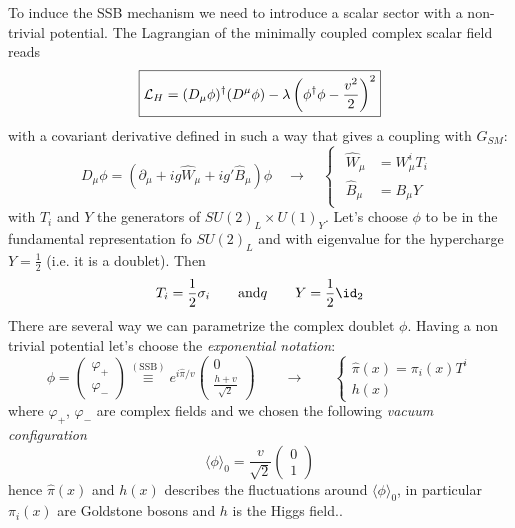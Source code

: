 \documentclass[TheoreticalPhy_ModB.tex]{subfiles}
\begin{document}
To induce the SSB mechanism we need to introduce a scalar sector with a non-trivial potential. The Lagrangian of the minimally coupled complex scalar field reads
\[\boxed{\mathcal L_{H}=(D_\mu\phi)^\dagger(D^\mu\phi)-\lambda\left(\phi^\dagger\phi-\frac{v^2}2\right)^2}\]
with a covariant derivative defined in such a way that gives a coupling with $G_{SM}$: 
\[D_\mu\phi=(\partial_\mu+ig\hat W_\mu+ig'\hat B_\mu)\phi\quad\to\quad\begin{cases}\begin{aligned}\hat W_\mu&=W_\mu^i T_i\\\hat B_\mu&=B_\mu Y\end{aligned}\end{cases}\]
with $T_i$ and $Y$ the generators of $SU(2)_L\times U(1)_Y$.
Let's choose $\phi$ to be in the fundamental representation fo $SU(2)_L$ and with eigenvalue for the hypercharge $Y=\frac12$ (i.e. it is a doublet). Then
\[T_i=\frac12\sigma_i\qquad\text{and}q\qquad Y=\frac12\id_2\]
There are several way we can parametrize the complex doublet $\phi$. Having a non trivial potential let's choose the \emph{exponential notation}:
\[\phi=\begin{pmatrix}\varphi_+\\\varphi_-\end{pmatrix}\overset{(\text{SSB})}{\equiv}e^{i\hat\pi/v}\begin{pmatrix}0\\\frac{h+v}{\sqrt2}\end{pmatrix}\qquad\to\qquad\begin{cases}\hat \pi(x)=\pi_i(x)T^i\\h(x)\end{cases}\]
where $\varphi_+$, $\varphi_-$ are complex fields and we chosen the following  \emph{vacuum configuration}
\begin{equation}\label{eqn:vacuum-config-SM}
\langle\phi\rangle_0=\frac v{\sqrt2}\begin{pmatrix}0\\1\end{pmatrix}
\end{equation}
hence $\hat\pi(x)$ and $h(x)$ describes the fluctuations around $\langle\phi\rangle_0$, in particular $\pi_i(x)$ are Goldstone bosons and $h$ is the Higgs field..
\end{document}
